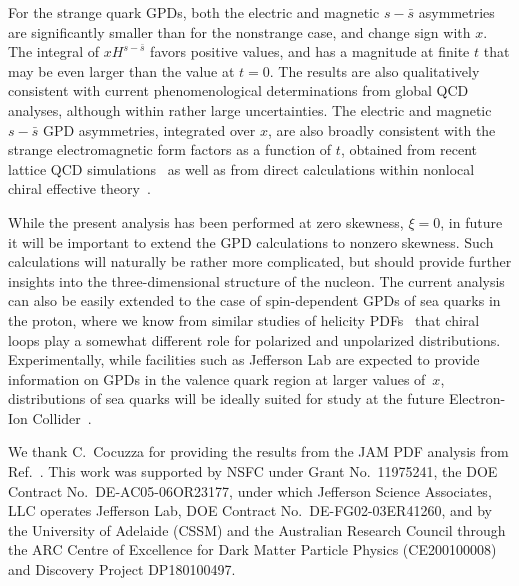 \documentclass[preprintnumbers,prd,superscriptaddress,preprint]{revtex4-1}
\begin{document}
For the strange quark GPDs, both the electric and magnetic $s-\bar{s}$ asymmetries are significantly smaller than for the nonstrange case, and change sign with $x$.
The integral of $xH^{s-\bar{s}}$ favors positive values, and has a magnitude at finite $t$ that may be even larger than the value at $t=0$.
The results are also qualitatively consistent with current phenomenological determinations from global QCD analyses, although within rather large uncertainties.
The electric and magnetic $s-\bar s$ GPD asymmetries, integrated over $x$, are also broadly consistent with the strange electromagnetic form factors as a function of $t$, obtained from recent lattice QCD simulations~\cite{Sufian:2017osl} as well as from direct calculations within nonlocal chiral effective theory~\cite{He:2018eyz}.


While the present analysis has been performed at zero skewness, $\xi=0$, in future it will be important to extend the GPD calculations to nonzero skewness.
Such calculations will naturally be rather more complicated, but should provide further insights into the three-dimensional structure of the nucleon.
The current analysis can also be easily extended to the case of spin-dependent GPDs of sea quarks in the proton, where we know from similar studies of helicity PDFs~\cite{Wang:2020hkn} that chiral loops play a somewhat different role for polarized and unpolarized distributions.
Experimentally, while facilities such as Jefferson Lab are expected to provide information on GPDs in the valence quark region at larger values of~$x$, distributions of sea quarks will be ideally suited for study at the future Electron-Ion Collider~\cite{AbdulKhalek:2021gbh}. \\


\acknowledgments

We thank C.~Cocuzza for providing the results from the JAM PDF analysis from Ref.~\cite{Cocuzza:2021cbi}.
This work was supported by NSFC under Grant No.~11975241, the DOE Contract No.~DE-AC05-06OR23177, under which Jefferson Science Associates, LLC operates Jefferson Lab, DOE Contract No.~DE-FG02-03ER41260, and by the University of Adelaide (CSSM) and the Australian Research Council through the ARC Centre of Excellence for Dark Matter Particle Physics (CE200100008) and Discovery Project DP180100497.
\end{document}
